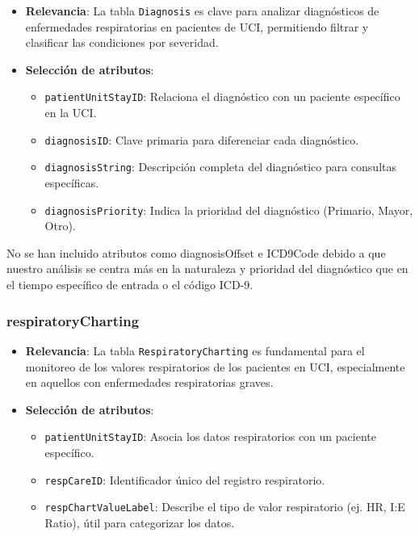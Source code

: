\documentclass[12pt, a4paper, twoside]{article}
\begin{document}
	\begin{itemize}
		\item \textbf{Relevancia}: La tabla \texttt{Diagnosis} es clave para analizar diagnósticos de enfermedades respiratorias en pacientes de UCI, permitiendo filtrar y clasificar las condiciones por severidad.
		
		\item \textbf{Selección de atributos}:
		\begin{itemize}
			\item \texttt{patientUnitStayID}: Relaciona el diagnóstico con un paciente específico en la UCI.
			\item \texttt{diagnosisID}: Clave primaria para diferenciar cada diagnóstico.
			\item \texttt{diagnosisString}: Descripción completa del diagnóstico para consultas específicas.
			\item \texttt{diagnosisPriority}: Indica la prioridad del diagnóstico (Primario, Mayor, Otro).
		\end{itemize}
	\end{itemize}
	
	No se han incluido atributos como diagnosisOffset e ICD9Code debido a que nuestro análisis se centra más en la naturaleza y prioridad del diagnóstico que en el tiempo específico de entrada o el código ICD-9. \cite{eICU2024}
	
	\subsubsection{respiratoryCharting}
	
	\begin{itemize}
		\item \textbf{Relevancia}: La tabla \texttt{RespiratoryCharting} es fundamental para el monitoreo de los valores respiratorios de los pacientes en UCI, especialmente en aquellos con enfermedades respiratorias graves.
		
		\item \textbf{Selección de atributos}:
		\begin{itemize}
			\item \texttt{patientUnitStayID}: Asocia los datos respiratorios con un paciente específico.
			\item \texttt{respCareID}: Identificador único del registro respiratorio.
			\item \texttt{respChartValueLabel}: Describe el tipo de valor respiratorio (ej. HR, I:E Ratio), útil para categorizar los datos.
		\end{itemize}
		
	\end{itemize}
	
\end{document}
